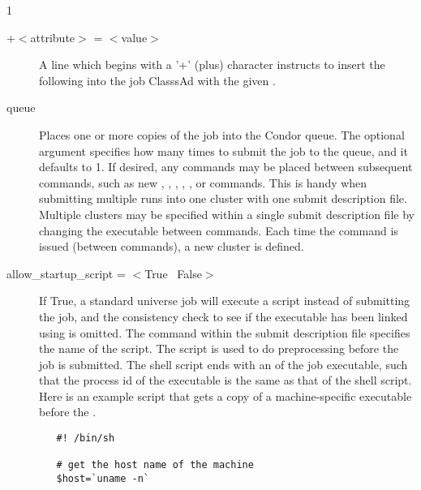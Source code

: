 \begin{ManPage}{\label{man-condor-submit}}{1}
\begin{description}

\item[+$<$attribute$>$ = $<$value$>$] A line which begins with a '+'
(plus) character instructs  to insert the
following  into the job ClasssAd with the given 
. 


\item[queue ] Places one or more
copies of the job into
the Condor queue. 
The optional
argument  specifies how many times to submit the
job to the queue, and it defaults to 1.
If desired, any commands may be placed
between subsequent  commands, such as new ,
, , , , or
 commands.
This is handy when submitting multiple runs into one cluster with
one submit description file.
Multiple clusters may be specified within a single 
submit description file by changing the executable between
 commands.
Each time the  command is issued (between  commands),
a new cluster is defined.

\item[allow\_startup\_script = $<$True \Bar\ False$>$]
If True, a standard universe job will execute a script
instead of submitting the job,
and the consistency check to see if the executable has
been linked using  is omitted.
The  command within the submit description
file specifies the name of the script.
The script is used to do preprocessing before the
job is submitted.
The shell script ends with an  of the
job executable, such that the process id of the executable is the
same as that of the shell script.
Here is an example script that gets a copy of a machine-specific
executable before the .
\begin{verbatim} 
   #! /bin/sh

   # get the host name of the machine
   $host=`uname -n`


\end{verbatim}
\end{description}
\end{ManPage}
